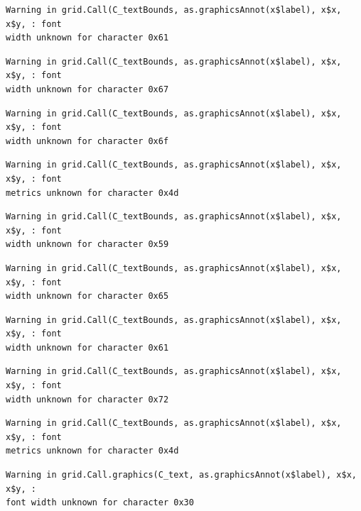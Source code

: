 \documentclass[
  letterpaper,
  DIV=11,
  numbers=noendperiod]{scrreprt}
\begin{document}
\begin{verbatim}
Warning in grid.Call(C_textBounds, as.graphicsAnnot(x$label), x$x, x$y, : font
width unknown for character 0x61
\end{verbatim}

\begin{verbatim}
Warning in grid.Call(C_textBounds, as.graphicsAnnot(x$label), x$x, x$y, : font
width unknown for character 0x67
\end{verbatim}

\begin{verbatim}
Warning in grid.Call(C_textBounds, as.graphicsAnnot(x$label), x$x, x$y, : font
width unknown for character 0x6f
\end{verbatim}

\begin{verbatim}
Warning in grid.Call(C_textBounds, as.graphicsAnnot(x$label), x$x, x$y, : font
metrics unknown for character 0x4d
\end{verbatim}

\begin{verbatim}
Warning in grid.Call(C_textBounds, as.graphicsAnnot(x$label), x$x, x$y, : font
width unknown for character 0x59
\end{verbatim}

\begin{verbatim}
Warning in grid.Call(C_textBounds, as.graphicsAnnot(x$label), x$x, x$y, : font
width unknown for character 0x65
\end{verbatim}

\begin{verbatim}
Warning in grid.Call(C_textBounds, as.graphicsAnnot(x$label), x$x, x$y, : font
width unknown for character 0x61
\end{verbatim}

\begin{verbatim}
Warning in grid.Call(C_textBounds, as.graphicsAnnot(x$label), x$x, x$y, : font
width unknown for character 0x72
\end{verbatim}

\begin{verbatim}
Warning in grid.Call(C_textBounds, as.graphicsAnnot(x$label), x$x, x$y, : font
metrics unknown for character 0x4d
\end{verbatim}

\begin{verbatim}
Warning in grid.Call.graphics(C_text, as.graphicsAnnot(x$label), x$x, x$y, :
font width unknown for character 0x30
\end{verbatim}
\end{document}
